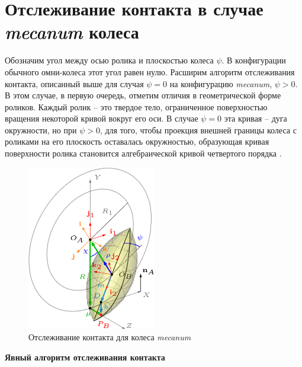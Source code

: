 \section{Отслеживание контакта в случае \textit{mecanum} колеса}\label{sect:track_mecanum}

Обозначим угол между осью ролика и плоскостью колеса $\psi$. В конфигурации обычного омни-колеса этот угол равен нулю. Расширим алгоритм отслеживания контакта, описанный выше для случая $\psi = 0$ на конфигурацию \textit{mecanum}, $\psi > 0$. В этом случае, в первую очередь, отметим отличия в геометрической форме роликов. Каждый ролик -- это твердое тело, ограниченное поверхностью вращения некоторой кривой вокруг его оси. В случае $\psi = 0$ эта кривая -- дуга окружности, но при $\psi > 0$, для того, чтобы проекция внешней границы колеса с роликами на его плоскость оставалась окружностью, образующая кривая поверхности ролика становится алгебраической кривой четвертого порядка \cite{Gfrerrer2008}.

\begin{figure}[H]
    \centering
    \includegraphics[width=0.5\textwidth]{./content/pic/asy/pic_mecanum.png}
    \caption{Отслеживание контакта для колеса \textit{mecanum}}
    \label{fig:mecanum}
\end{figure}

% 


\textbf{Явный алгоритм отслеживания контакта}

